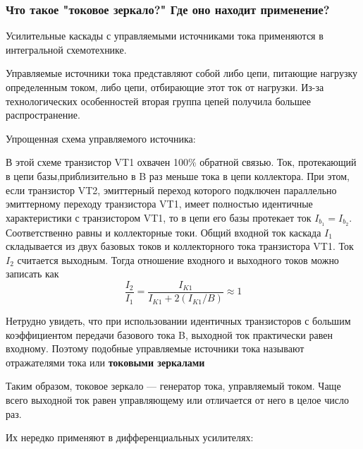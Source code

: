 \subsubsection{Что такое "токовое зеркало?" Где оно находит применение?}

Усилительные каскады с управляемыми источниками тока применяются в интегральной схемотехнике.

Управляемые источники тока представляют собой либо цепи, питающие нагрузку определенным током, либо цепи, отбирающие этот ток от нагрузки. Из-за технологических особенностей вторая группа цепей получила большее распространение. 

Упрощенная схема управляемого источника:
\begin{center}
	\begin{figure}[h!]
		\caption{}	
	\end{figure}
\end{center}
В этой схеме транзистор VT1 охвачен 100$\%$ обратной связью. Ток, протекающий в цепи базы,приблизительно в B раз меньше тока в цепи коллектора. При этом, если транзистор VT2, эмиттерный переход которого подключен параллельно эмиттерному переходу транзистора VT1, имеет полностью идентичные характеристики с транзистором VT1, то в цепи его базы протекает ток $I_{b_1} = I_{b_2}$. Соответственно равны и коллекторные токи. Общий входной ток каскада $I_1$ складывается из двух базовых токов и коллекторного тока транзистора VT1. Ток $I_2$ считается выходным. Тогда отношение входного и выходного токов можно записать как 
$$
\frac{I_2}{I_1} = \frac{I_{K1}}{I_{K1} + 2(I_{K1}/B)} \approx 1
$$

Нетрудно увидеть, что при использовании идентичных транзисторов с большим коэффициентом передачи базового тока B, выходной ток практически равен входному. Поэтому подобные управляемые источники тока называют отражателями тока или \textbf{токовыми зеркалами}

Таким образом, токовое зеркало — генератор тока, управляемый током. Чаще всего выходной ток равен управляющему или отличается от него в целое число раз.

Их нередко применяют в дифференциальных усилителях:
\begin{center}
	\begin{figure}[h!]
		\caption{}	
	\end{figure}
\end{center}


